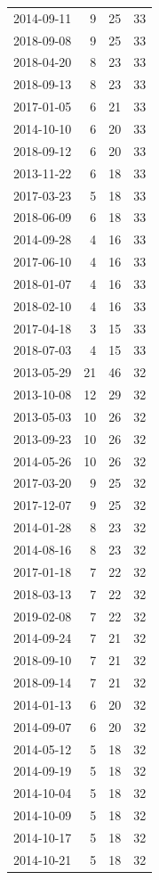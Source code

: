 \begin{tabular}{lrrr}
2014-09-11 & 9 & 25 & 33 \\
2018-09-08 & 9 & 25 & 33 \\
2018-04-20 & 8 & 23 & 33 \\
2018-09-13 & 8 & 23 & 33 \\
2017-01-05 & 6 & 21 & 33 \\
2014-10-10 & 6 & 20 & 33 \\
2018-09-12 & 6 & 20 & 33 \\
2013-11-22 & 6 & 18 & 33 \\
2017-03-23 & 5 & 18 & 33 \\
2018-06-09 & 6 & 18 & 33 \\
2014-09-28 & 4 & 16 & 33 \\
2017-06-10 & 4 & 16 & 33 \\
2018-01-07 & 4 & 16 & 33 \\
2018-02-10 & 4 & 16 & 33 \\
2017-04-18 & 3 & 15 & 33 \\
2018-07-03 & 4 & 15 & 33 \\
2013-05-29 & 21 & 46 & 32 \\
2013-10-08 & 12 & 29 & 32 \\
2013-05-03 & 10 & 26 & 32 \\
2013-09-23 & 10 & 26 & 32 \\
2014-05-26 & 10 & 26 & 32 \\
2017-03-20 & 9 & 25 & 32 \\
2017-12-07 & 9 & 25 & 32 \\
2014-01-28 & 8 & 23 & 32 \\
2014-08-16 & 8 & 23 & 32 \\
2017-01-18 & 7 & 22 & 32 \\
2018-03-13 & 7 & 22 & 32 \\
2019-02-08 & 7 & 22 & 32 \\
2014-09-24 & 7 & 21 & 32 \\
2018-09-10 & 7 & 21 & 32 \\
2018-09-14 & 7 & 21 & 32 \\
2014-01-13 & 6 & 20 & 32 \\
2014-09-07 & 6 & 20 & 32 \\
2014-05-12 & 5 & 18 & 32 \\
2014-09-19 & 5 & 18 & 32 \\
2014-10-04 & 5 & 18 & 32 \\
2014-10-09 & 5 & 18 & 32 \\
2014-10-17 & 5 & 18 & 32 \\
2014-10-21 & 5 & 18 & 32 \\

\end{tabular}
